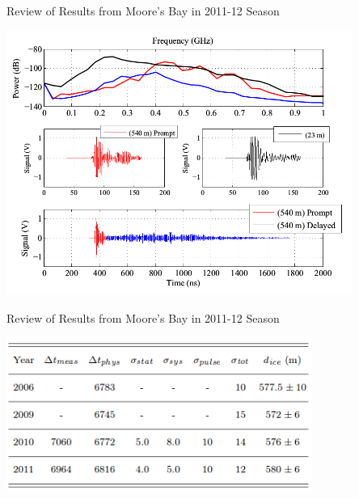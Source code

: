 \documentclass{beamer}
\begin{document}
\begin{frame}{Review of Results from Moore's Bay in 2011-12 Season}
\begin{center}
\includegraphics[width=0.85\textwidth]{mooreResult1.png}
\end{center}
\end{frame}

\begin{frame}{Review of Results from Moore's Bay in 2011-12 Season}
\begin{center}
\includegraphics[width=0.75\textwidth]{thicknessMoore.png}
\end{center}
\end{frame}
\end{document}
